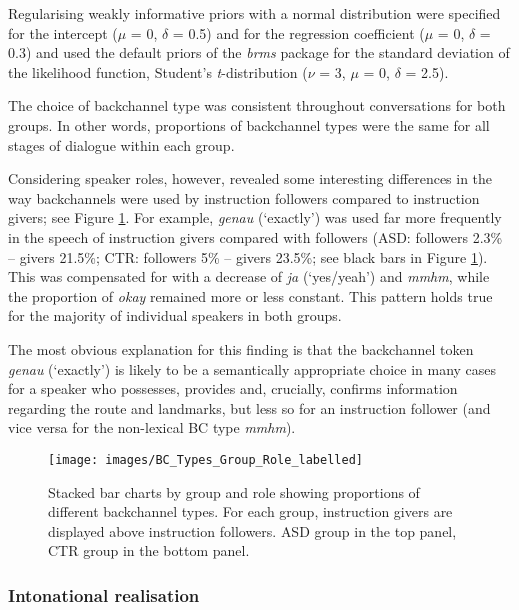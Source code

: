 Regularising weakly informative priors with a normal distribution  were specified for the intercept (\(\mu\) = 0, \(\delta\) = 0.5) and for the regression coefficient (\(\mu\) = 0, \(\delta\) = 0.3) and used the default priors of the \emph{brms} package for the standard deviation of the likelihood function, Student's \emph{t}-distribution (\(\nu\) = 3, \(\mu\) = 0, \(\delta\) = 2.5).

\label{BCFP_BC_results_BCType_roleandstage}

The choice of backchannel type was consistent throughout conversations for both groups. In other words, proportions of backchannel types were the same for all stages of dialogue within each group.

Considering speaker roles, however, revealed some interesting differences in the way backchannels were used by instruction followers compared to instruction givers; see Figure \ref{fig:BCTypeGroupRolePic}. For example, \emph{genau} (`exactly') was used far more frequently in the speech of instruction givers compared with followers (ASD: followers 2.3\% -- givers 21.5\%; CTR: followers 5\% -- givers 23.5\%; see black bars in Figure \ref{fig:BCTypeGroupRolePic}). This was compensated for with a decrease of \emph{ja} (`yes/yeah') and \emph{mmhm}, while the proportion of \emph{okay} remained more or less constant. This pattern holds true for the majority of individual speakers in both groups.

The most obvious explanation for this finding is that the backchannel token \emph{genau} (`exactly') is likely to be a semantically appropriate choice in many cases for a speaker who possesses, provides and, crucially, confirms information regarding the route and landmarks, but less so for an instruction follower (and vice versa for the non-lexical BC type \emph{mmhm}).



\begin{figure}

\texttt{[image: images/BC\_Types\_Group\_Role\_labelled]} \hfill{}

\caption{Stacked bar charts by group and role showing proportions of different backchannel types. For each group, instruction givers are displayed above instruction followers. ASD group in the top panel, CTR group in the bottom panel.}\label{fig:BCTypeGroupRolePic}
\end{figure}


\subsubsection{Intonational realisation}\label{BCFP_BC_results_BCIntonation}



